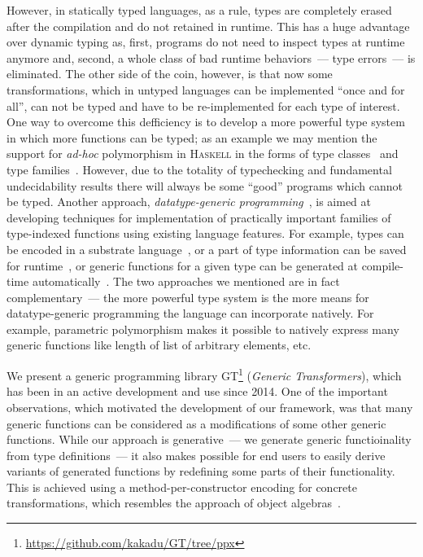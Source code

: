 However, in statically typed languages, as a rule, types are completely erased after the compilation and do not retained in runtime. This has a huge advantage over
dynamic typing as, first, programs do not need to inspect types at runtime anymore and, second, a whole class of bad runtime behaviors~--- type errors~---
is eliminated. The other side of the coin, however, is that now some transformations, which in untyped languages can be implemented ``once and for all'',
can not be typed and have to be re-implemented for each type of interest. One way to overcome this defficiency is to develop a more powerful type system in
which more functions can be typed; as an example we may mention the support for \emph{ad-hoc} polymorphism in \textsc{Haskell} in the forms of type
classes~\cite{TypeClasses} and type families~\cite{TypeFamilies}. However, due to the totality of typechecking and fundamental undecidability results there
will always be some ``good'' programs which cannot be typed. Another approach, \emph{datatype-generic programming}~\cite{DGP}, is aimed at developing techniques for
implementation of practically important families of type-indexed functions using existing language features. For example, types can be encoded in a substrate
language~\cite{Hinze,InstantGenerics,GenericOCaml}, or a part of type information can be saved for runtime~\cite{SYB,SYBOCaml}, or generic functions for a given
type can be generated at compile-time automatically~\cite{Yallop,PPXLib}. The two approaches we mentioned are in fact complementary~--- the more powerful
type system is the more means for datatype-generic programming the language can incorporate natively. For example, parametric polymorphism makes it possible
to natively express many generic functions like length of list of arbitrary elements, etc.

We present a generic programming library \textsc{GT}\footnote{\url{https://github.com/kakadu/GT/tree/ppx}} (\emph{Generic Transformers}), which has been in an
active development and use since 2014. One of the important observations, which motivated the development of our framework, was that many generic functions
can be considered as a modifications of some other generic functions. While our approach is generative~--- we generate generic functioinality from type definitions~---
it also makes possible for end users to easily derive variants of generated functions by redefining some parts of their functionality. This is achieved using
a method-per-constructor encoding for concrete transformations, which resembles the approach of object algebras~\cite{ObjectAlgebras}.

